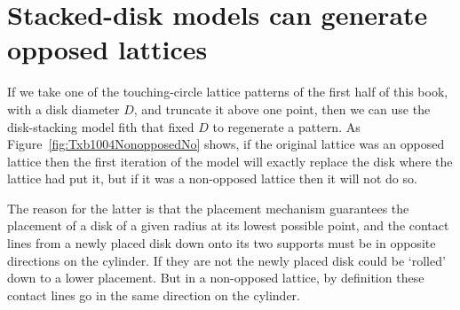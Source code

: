 \clearpage
\section{Stacked-disk models can generate opposed lattices}
If we take one of the touching-circle lattice patterns of the first half of this book, with a disk diameter $D$, and truncate it above one point, then
we can use the disk-stacking model fith that fixed $D$ to regenerate a pattern. As Figure~\ref{fig:Txb1004NonopposedNo} shows, if the original lattice was an opposed lattice then the first iteration of the model will exactly replace the disk where the lattice had put it, but if it was a non-opposed lattice then it will not do so.


The reason for the latter is that the placement mechanism guarantees the placement of a disk of a given radius at its lowest possible point, and the contact lines from a newly placed disk down onto its two supports must be in opposite directions on the cylinder. If they are not the newly placed disk could be `rolled' down to a lower placement. But in a non-opposed lattice, by definition these contact lines go in the same direction on the cylinder.


